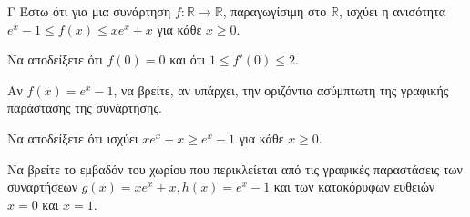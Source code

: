 \begin{thema}{Γ}
Έστω ότι για μια συνάρτηση $f: \mathbb{R} \to \mathbb{R}$, παραγωγίσιμη στο $\mathbb{R}$, ισχύει η ανισότητα $e^x - 1 \le f(x) \le x e^x + x$ για κάθε $x \ge 0$.
\begin{erwthma}
  \item Να αποδείξετε ότι $f(0) = 0$ και ότι $1 \le f'(0) \le 2$.
  \item Αν $f(x) = e^x - 1$, να βρείτε, αν υπάρχει, την οριζόντια ασύμπτωτη της γραφικής παράστασης της συνάρτησης.
  \item Να αποδείξετε ότι ισχύει $xe^x + x \ge e^x - 1$ για κάθε $x \ge 0$.
  \item Να βρείτε το εμβαδόν του χωρίου που περικλείεται από τις γραφικές παραστάσεις των συναρτήσεων $g(x) = xe^x + x, h(x) = e^x - 1$ και των κατακόρυφων ευθειών $x=0$ και $x=1$.
\end{erwthma}
\end{thema}
